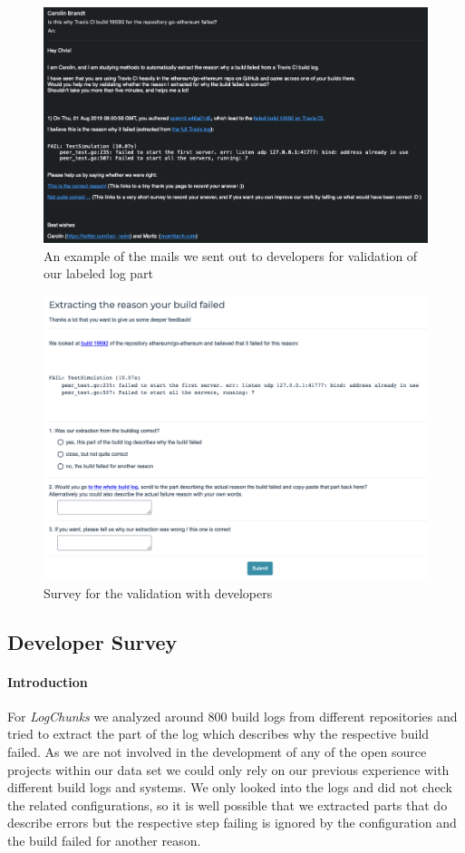 \documentclass[\myrootdir/main.tex]{subfiles}
\begin{document}
\begin{figure}[h]
	\centering
	\includegraphics[width=\textwidth, clip]{img/dev-mail.png}
	\caption{An example of the mails we sent out to developers for validation of our labeled log part}
	\label{fig:dev-mail}
\end{figure}
\begin{figure}[h]
	\centering
	\includegraphics[width=\textwidth, clip]{img/dev-survey.png}
	\caption{Survey for the validation with developers}
	\label{fig:dev-survey}
\end{figure}

\subsection{Developer Survey}

\paragraph{Introduction}
For \emph{LogChunks} we analyzed around 800 build logs from different repositories and tried to extract the part of the log which describes why the respective build failed.
As we are not involved in the development of any of the open source projects within our data set we could only rely on our previous experience with different build logs and systems.
We only looked into the logs and did not check the related configurations, so it is well possible that we extracted parts that do describe errors but the respective step failing is ignored by the configuration and the build failed for another reason.
\end{document}
